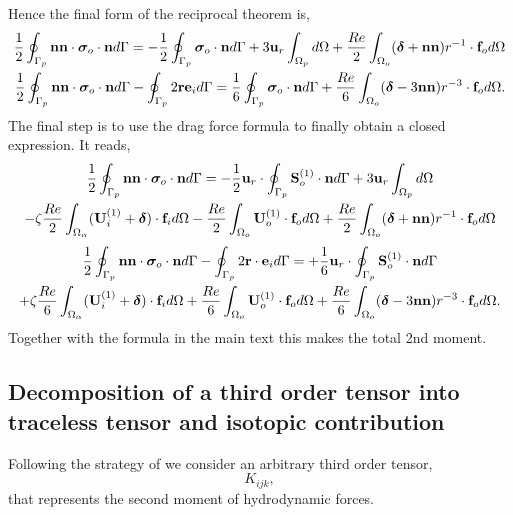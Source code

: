 Hence the final form of the reciprocal theorem is, 
\begin{align}
    \frac{1}{2}\intS[p]{\textbf{nn} \cdot  \bm\sigma_{o}\cdot \textbf{n}}
    =
    - \frac{1}{2}\intS[p]{ \bm\sigma_{o}\cdot \textbf{n}}
    + 3\textbf{u}_r \intO[p]{}
    + \frac{Re}{2}\intO[o]{(\bm\delta + \textbf{nn})r^{-1}\cdot \textbf{f}_{o}}\\
    \frac{1}{2}\intS[p]{\textbf{nn} \cdot  \bm\sigma_{o}\cdot \textbf{n}}
    - \intS[p]{2 \textbf{r}\textbf{e}_i}
    =
    \frac{1}{6}\intS[p]{\bm\sigma_{o}\cdot \textbf{n}}
    + 
    \frac{Re}{6}\intO[o]{(\bm\delta - 3\textbf{nn})r^{-3}\cdot \textbf{f}_{o}}.
\end{align}
The final step is to use the drag force formula to finally obtain a closed expression. 
It reads, 
\begin{multline}
    \frac{1}{2}\intS[p]{\textbf{nn} \cdot  \bm\sigma_{o}\cdot \textbf{n}}
    =
    - \frac{1}{2}
    \textbf{u}_{r}\cdot  \intS[p]{\textbf{S}_{o}^{(1)}\cdot \textbf{n}}
    + 3\textbf{u}_r \intO[p]{}\\
    - \zeta \frac{Re}{2} \intO{(\textbf{U}_{i}^{(1)} + \bm\delta)\cdot \textbf{f}_{i}} 
    - \frac{Re}{2}\intO[o]{\textbf{U}_{o}^{(1)}\cdot \textbf{f}_{o}}
    + \frac{Re}{2}\intO[o]{(\bm\delta + \textbf{nn})r^{-1}\cdot \textbf{f}_{o}}\\
\end{multline}
\begin{multline}
    \frac{1}{2}\intS[p]{\textbf{nn} \cdot  \bm\sigma_{o}\cdot \textbf{n}}
    - \intS[p]{2 \textbf{r}\cdot \textbf{e}_i}
    =
    +\frac{1}{6}
    \textbf{u}_{r}\cdot  \intS[p]{\textbf{S}_{o}^{(1)}\cdot \textbf{n}}\\
    + \zeta \frac{Re}{6} \intO{(\textbf{U}_{i}^{(1)} + \bm\delta)\cdot \textbf{f}_{i}} 
    + \frac{Re}{6}\intO[o]{\textbf{U}_{o}^{(1)}\cdot \textbf{f}_{o}}
    + 
    \frac{Re}{6}\intO[o]{(\bm\delta - 3\textbf{nn})r^{-3}\cdot \textbf{f}_{o}}.
\end{multline}
Together with the formula in the main text this makes the total 2nd moment. 

\subsection{Decomposition of a third order tensor into traceless tensor and isotopic contribution}

Following the strategy of \citet{nadim1991motion} we consider an arbitrary third order tensor,
\begin{equation}
    K_{ijk},
\end{equation}
that represents the second moment of hydrodynamic forces. 

